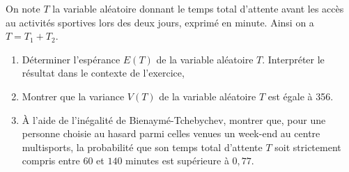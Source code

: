 \documentclass[10pt]{article}
\begin{document}
\medskip

On note $T$ la variable aléatoire donnant le temps total d'attente avant les accès au activités sportives lors des deux jours, exprimé en minute. Ainsi on a $T = T_1 + T_2$.

\medskip

\begin{enumerate}
\item Déterminer l'espérance $E(T)$ de la variable aléatoire $T$. Interpréter le résultat dans le contexte de l'exercice,
\item Montrer que la variance $V(T)$ de la variable aléatoire $T$ est égale à 356.
\item À l'aide de l'inégalité de Bienaymé-Tchebychev, montrer que, pour une personne
choisie au hasard parmi celles venues un week-end au centre multisports, la probabilité que son temps total d'attente $T$ soit strictement compris entre $60$ et $140$ minutes est supérieure à $0,77$.
\end{enumerate}

\bigskip
\end{document}

